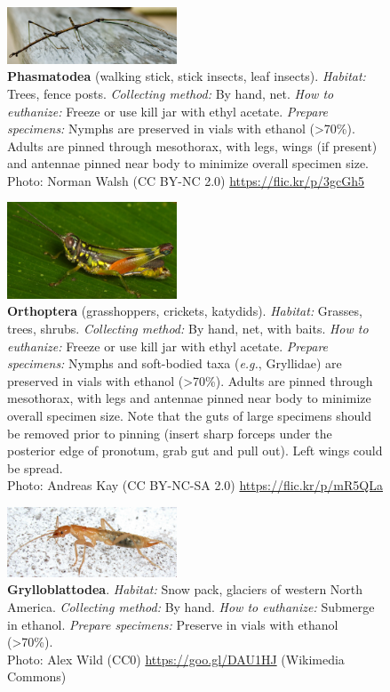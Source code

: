 \documentclass[letterpaper, 11pt]{article}
\begin{document}
\begin{figure}
  \caption{\textbf{Phasmatodea} (walking stick, stick insects, leaf insects). \textit{Habitat:} Trees, fence posts. \textit{Collecting method:} By hand, net. \textit{How to euthanize:} Freeze or use kill jar with ethyl acetate. \textit{Prepare specimens:} Nymphs are preserved in vials with ethanol (\textgreater70\%). Adults are pinned through mesothorax, with legs, wings (if present) and antennae pinned near body to minimize overall specimen size. \\ Photo: Norman Walsh (CC BY-NC 2.0) \url{https://flic.kr/p/3gcGh5}}
  \includegraphics[width=0.45\textwidth]{Phasmatodea}
\end{figure}

\begin{figure}
  \caption{\textbf{Orthoptera} (grasshoppers, crickets, katydids). \textit{Habitat:} Grasses, trees, shrubs. \textit{Collecting method:} By hand, net, with baits. \textit{How to euthanize:} Freeze or use kill jar with ethyl acetate. \textit{Prepare specimens:} Nymphs and soft-bodied taxa (\textit{e.g.}, Gryllidae) are preserved in vials with ethanol (\textgreater70\%). Adults are pinned through mesothorax, with legs and antennae pinned near body to minimize overall specimen size. Note that the guts of large specimens should be removed prior to pinning (insert sharp forceps under the posterior edge of pronotum, grab gut and pull out). Left wings could be spread. \\ Photo: Andreas Kay (CC BY-NC-SA 2.0) \url{https://flic.kr/p/mR5QLa}}
  \includegraphics[width=0.45\textwidth]{Orthoptera}
\end{figure}

\clearpage

\begin{figure}
  \caption{\textbf{Grylloblattodea}. \textit{Habitat:} Snow pack, glaciers of western North America. \textit{Collecting method:} By hand. \textit{How to euthanize:} Submerge in ethanol. \textit{Prepare specimens:} Preserve in vials with ethanol (\textgreater70\%).\\ Photo: Alex Wild (CC0) \url{https://goo.gl/DAU1HJ} (Wikimedia Commons)}
  \includegraphics[width=0.45\textwidth]{Grylloblattodea}
\end{figure}
\end{document}
